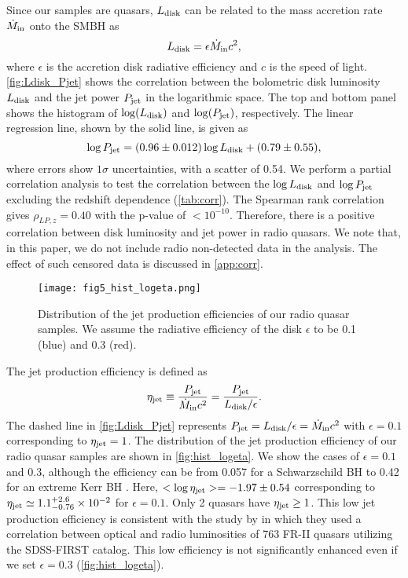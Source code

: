 \documentclass[preprint2,twocolappendix]{aastex6}
\begin{document}
Since our samples are quasars, $L_{\rm disk}$ can be related to the mass accretion rate $\dot{M}_{\rm in}$ onto the SMBH as
\begin{equation}
L_{\rm disk} = \epsilon \dot{M}_{\rm in} c^2,
\end{equation}
where $\epsilon$ is the accretion disk radiative efficiency and $c$ is the speed of light. \autoref{fig:Ldisk_Pjet} shows the correlation between the bolometric disk luminosity $L_{\rm disk}$ and the jet power $P_{\rm jet}$ in the logarithmic space. The top and bottom panel shows the histogram of $\log (L_{\rm disk})$ and $\log(P_{\rm jet})$, respectively. The linear regression line, shown by the solid line, is given as
\begin{equation}
\log P_{\rm jet} = (0.96\pm0.012)\log L_{\rm disk} + (0.79 \pm 0.55),
\label{eq:jet_disk}
\end{equation}
where errors show $1\sigma$ uncertainties, with a scatter of 0.54. We perform a partial correlation analysis to test the correlation between the $\log L_{\rm disk}$ and $\log P_{\rm jet}$ excluding the redshift dependence (\autoref{tab:corr}). The Spearman rank correlation gives $\rho_{LP,z}=0.40$ with the p-value of $<10^{-10}$. Therefore, there is a positive correlation between disk luminosity and jet power in radio quasars. We note that, in this paper, we do not include radio non-detected data in the analysis. The effect of such censored data is discussed in \autoref{app:corr}.


\begin{figure}[t]
 \begin{center}
  \texttt{[image: fig5\_hist\_logeta.png]} 
 \end{center}
\caption{Distribution of the jet production efficiencies of our radio quasar samples. We assume the radiative efficiency of the disk $\epsilon$ to be 0.1 (blue) and 0.3 (red).}\label{fig:hist_logeta}
\end{figure}

The jet production efficiency is defined as
\begin{equation}
\eta_{\rm jet} \equiv \frac{P_{\rm jet}}{\dot{M}_{\rm in} c^2} = \frac{P_{\rm jet}}{L_{\rm disk}/\epsilon}.
\end{equation} 
The dashed line in \autoref{fig:Ldisk_Pjet} represents $P_{\rm jet} = L_{\rm disk}/\epsilon=\dot{M}_{\rm in} c^2$ with $\epsilon = 0.1$ corresponding to $\eta_{\rm jet}=1$. The distribution of the jet production efficiency of our radio quasar samples are shown in \autoref{fig:hist_logeta}. We show the cases of $\epsilon=0.1$ and $0.3$, although the efficiency can be from 0.057 for a Schwarzschild BH to 0.42 for an extreme Kerr BH \citep[e.g.][]{kat98}. Here, $<\log \eta_{\rm jet}>=-1.97\pm0.54$ corresponding to $\eta_{\rm jet}\simeq1.1_{-0.76}^{+2.6}\times10^{-2}$ for $\epsilon=0.1$. Only 2 quasars have $\eta_{\rm jet}\geq1$. This low jet production efficiency is consistent with the study by \citet{van13} in which they used a correlation between optical and radio luminosities of 763 FR-II quasars utilizing the SDSS-FIRST catalog.  This low efficiency is not significantly enhanced even if we set $\epsilon=0.3$ (\autoref{fig:hist_logeta}). 
\end{document}
